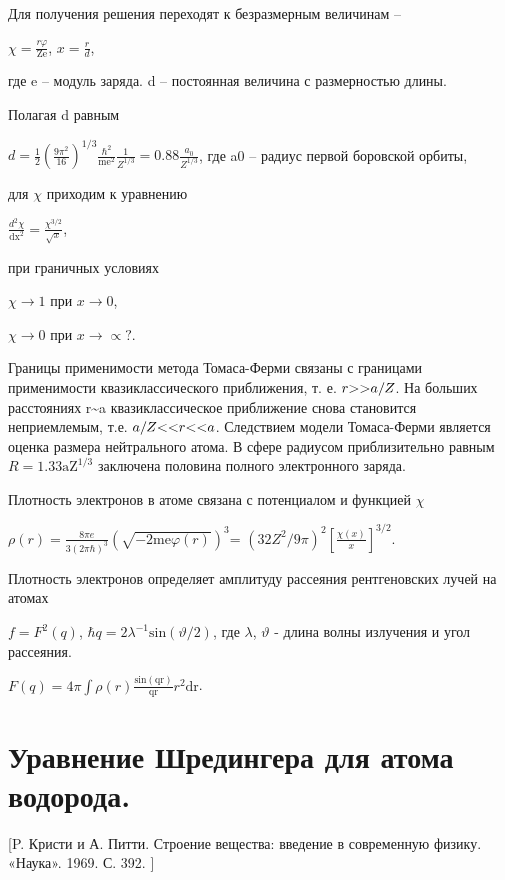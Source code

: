 \documentclass[a4paper,14pt, openany, twoside, draft]{extbook} %
\begin{document}
Для получения решения переходят к безразмерным величинам –

 $\chi =\frac{\mathit{r\varphi }}{{\text{Ze}}}$,  $x=\frac r d$,

где e – модуль заряда. d – постоянная величина с размерностью длины.

Полагая d равным

 $d=\frac 1 2\left(\frac{9\pi ^2}{16}\right)^{1/3}\frac{\hbar ^2}{{\text{me}}^2}\frac 1{Z^{1/3}}=0.88\frac{a_0}{Z^{1/3}}$, где a0 – радиус первой боровской орбиты,

для ${\chi}$  приходим к уравнению

 $\frac{d^2\chi }{{\text{dx}}^2}=\frac{\chi ^{3/2}}{\sqrt x}$,

при граничных условиях

 $\chi \rightarrow 1$ при  $x\rightarrow 0$,

 $\chi \rightarrow 0$ при  $x\rightarrow \propto ?$.

Границы применимости метода Томаса-Ферми связаны с границами применимости квазиклассического приближения, т. е.  $r\text{{\textgreater}{\textgreater}}a/Z$. На больших расстояниях r\~{}a квазиклассическое приближение снова становится неприемлемым, т.е.  $a/Z\text{{\textless}{\textless}}r\text{{\textless}{\textless}}a$. Следствием модели Томаса-Ферми является оценка размера нейтрального атома. В сфере радиусом приблизительно равным  $R=1.33{\text{aZ}}^{1/3}$ заключена половина полного электронного заряда.

Плотность электронов в атоме связана с потенциалом и функцией  $\chi $

 $\rho (r)=\frac{8\mathit{\pi e}}{3(2\pi \hbar )^3}\left(\sqrt{-2{\text{me}}\varphi (r)}\right)^3$= $\left(32Z^2/9\pi \right)^2\left[\frac{\chi (x)} x\right]^{3/2}$.

Плотность электронов определяет амплитуду рассеяния рентгеновских лучей на атомах

 $f=F^2(q)$,  $\hbar q=2\lambda ^{-1}\text{sin}(\vartheta /2)$, где ${\lambda}$,  $\vartheta $ - длина волны излучения и угол рассеяния.

 $F(q)=4\pi \int \rho (r)\frac{\text{sin}({\text{qr}})}{{\text{qr}}}r^2{\text{dr}}$.\ \ \ \

\section{Уравнение Шредингера для атома водорода.}
\label{sec:schredinger}
[P. Кристи и  А. Питти. Строение вещества: введение в современную физику. «Наука». 1969. С. 392. ]
\end{document}
